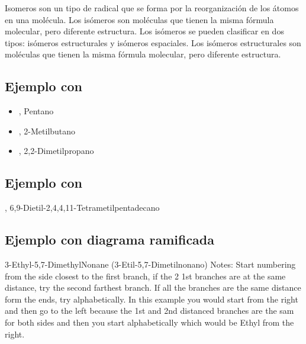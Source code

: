 \documentclass{article}
\begin{document}
Isomeros son un tipo de radical que se forma por la reorganización de los átomos en una molécula. Los isómeros son moléculas que tienen la misma fórmula molecular, pero diferente estructura. Los isómeros se pueden clasificar en dos tipos: isómeros estructurales y isómeros espaciales. Los isómeros estructurales son moléculas que tienen la misma fórmula molecular, pero diferente estructura.

\subsection*{Ejemplo con }

\begin{itemize}
    \item {}, Pentano
    \item {}, 2-Metilbutano
    \item {}, 2,2-Dimetilpropano
    \end{itemize}
    \qquad
    \subsection*{Ejemplo con }
    , 6,9-Dietil-2,4,4,11-Tetrametilpentadecano
    \qquad
\subsection*{Ejemplo con diagrama ramificada}
3-Ethyl-5,7-DimethylNonane (3-Etil-5,7-Dimetilnonano)
\quad
Notes: Start numbering from the side closest to the first branch, if the 2 1st branches are at the same distance, try the second farthest branch. If all the branches are the same distance form the ends, try alphabetically. In this example you would start from the right and then go to the left because the 1st and 2nd distanced branches are the sam for both sides and then you start alphabetically which would be Ethyl from the right.
\end{document}
